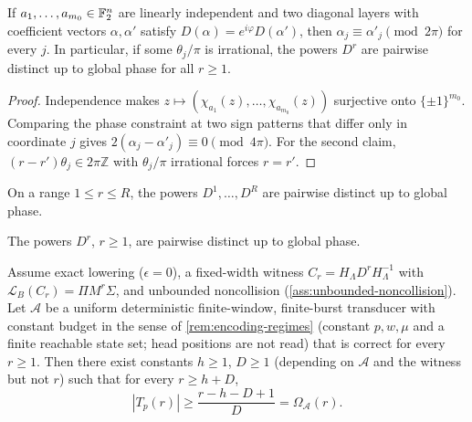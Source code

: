 \begin{lemma}
\label{lem:coeff-uniqueness}
If $a_1,\ldots,a_{m_0} \in \mathbb{F}_2^{n}$ are linearly independent and two
diagonal layers with coefficient vectors $\alpha, \alpha'$ satisfy
$D(\alpha) = e^{i\varphi} D(\alpha')$, then
$\alpha_j \equiv \alpha'_j \pmod{2\pi}$ for every $j$. In particular, if
some $\theta_j/\pi$ is irrational, the powers $D^{r}$ are pairwise
distinct up to global phase for all $r \geq 1$.
\end{lemma}

\begin{proof}
Independence makes
$z \mapsto (\chi_{a_1}(z),\ldots,\chi_{a_{m_0}}(z))$ surjective onto
$\{\pm 1\}^{m_0}$. Comparing the phase constraint at two sign patterns
that differ only in coordinate $j$ gives
$2(\alpha_j - \alpha'_j) \equiv 0 \pmod{4\pi}$. For the second claim,
$(r-r')\theta_j \in 2\pi\mathbb{Z}$ with $\theta_j/\pi$ irrational forces
$r = r'$.
\end{proof}

\begin{assumption}
\label{ass:noncollision}
On a range $1 \leq r \leq R$, the powers $D^1,\ldots,D^R$ are pairwise
distinct up to global phase.
\end{assumption}

\begin{assumption}
\label{ass:unbounded-noncollision}
The powers $D^r$, $r \geq 1$, are pairwise distinct up to global phase.
\end{assumption}

\begin{corollary}
\label{cor:exact-semantics-corollary}
\label{thm:final-output}
Assume exact lowering ($\epsilon = 0$), a fixed-width witness
$C_r = H_\Lambda D^r H_\Lambda^{-1}$ with
$\mathcal{L}_B(C_r) = \Pi M^r \Sigma$, and unbounded noncollision
(\cref{ass:unbounded-noncollision}). Let $\mathcal{A}$ be a uniform
deterministic finite-window, finite-burst transducer with constant budget
in the sense of \cref{rem:encoding-regimes} (constant $p,w,\mu$ and a
finite reachable state set; head positions are not read) that is correct
for every $r \geq 1$. Then there exist constants
$h \geq 1$, $D \geq 1$ (depending on $\mathcal{A}$ and the witness but not
$r$) such that for every $r \geq h + D$,
\begin{equation}\label{eq:exact-output-bound}
  |T_p(r)| \geq \frac{r-h-D+1}{D} = \Omega_{\mathcal{A}}(r).
\end{equation}
\end{corollary}

